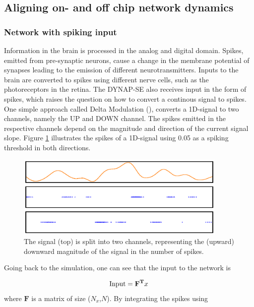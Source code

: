 \documentclass[twoside,11pt]{article}
\begin{document}
\subsection{Aligning on- and off chip network dynamics}
\subsubsection{Network with spiking input} \label{sec:spiking-input}

Information in the brain is processed in the analog and digital domain. Spikes, emitted from pre-synaptic
neurons, cause a change in the membrane potential of synapses leading to the emission of different
neurotransmitters. Inputs to the brain are converted to spikes using different nerve cells, such as the
photoreceptors in the retina. The DYNAP-SE also receives input in the form of spikes, which raises the question
on how to convert a continous signal to spikes. One simple approach called Delta Modulation (\cite{corradi}),
converts a 1D-signal to two channels, namely the UP and DOWN channel. The spikes emitted in the respective
channels depend on the magnitude and direction of the current signal slope. Figure \ref{fig:delta_modulated_input}
illustrates the spikes of a 1D-signal using 0.05 as a spiking threshold in both directions.


\begin{figure}[!htb]
  \includegraphics[width = \columnwidth, height=4cm]{figures/delta_modulated_input.eps}
  \caption{The signal (top) is split into two channels, representing the (upward) downward
  magnitude of the signal in the number of spikes.}
  \label{fig:delta_modulated_input}
\end{figure}

Going back to the simulation, one can see that the input to the network is 

\begin{equation*}
  \textnormal{Input} = \mathbf{F^T}x
\end{equation*}
where $\mathbf{F}$ is a matrix of size ($N_x$,$N$). By integrating the spikes using
\end{document}
